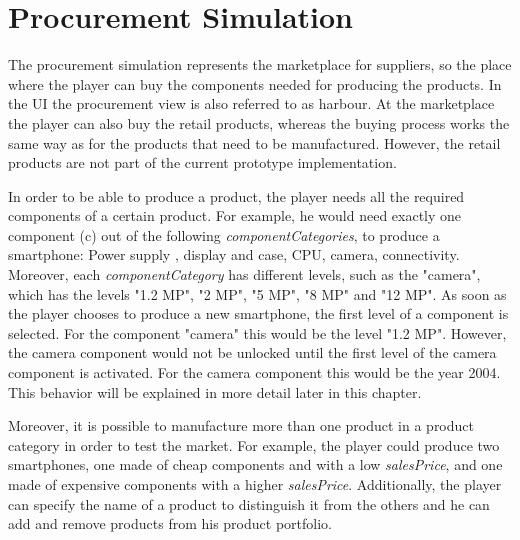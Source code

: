 \section{Procurement Simulation}
\label{procuresim}
The procurement simulation represents the marketplace for suppliers, so  the place where the player can buy the components needed for producing the products. In the UI the procurement view is also referred to as harbour. At the marketplace the player can also buy the retail products, whereas the buying process works the same way as for the products that need to be manufactured. However, the retail products are not part of the current prototype implementation.

In order to be able to produce a product, the player needs all the required components of a certain product. For example, he would need exactly one component (\gls{c}) out of the following \textit{componentCategories}, to produce a smartphone: Power supply , display and case, CPU, camera, connectivity. Moreover, each \textit{componentCategory} has different levels, such as the "camera", which has the levels "1.2 MP", "2 MP", "5 MP", "8 MP" and "12 MP".  As soon as the player chooses to produce a new smartphone, the first level of a component is selected. For the component "camera" this would be the level "1.2 MP". However, the camera component would not be unlocked until the first level of the camera component is activated. For the camera component this would be the year 2004. This behavior will be explained in more detail later in this chapter.

Moreover, it is possible to manufacture more than one product in a product category in order to test the market. For example, the player could produce two smartphones, one made of cheap components and with a low \textit{salesPrice}, and one made of expensive components with a higher \textit{salesPrice}. Additionally, the player can specify the name of a product to distinguish it from the others and he can add and remove products from his product portfolio.


